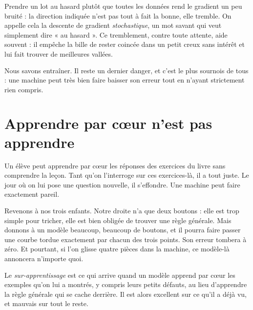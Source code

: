 \begin{plusloin}
Prendre un lot au hasard plutôt que toutes les données rend le gradient un
peu bruité : la direction indiquée n'est pas tout à fait la bonne, elle
tremble. On appelle cela la descente de gradient \emph{stochastique}, un mot
savant qui veut simplement dire « au hasard ». Ce tremblement, contre toute
attente, aide souvent : il empêche la bille de rester coincée dans un petit
creux sans intérêt et lui fait trouver de meilleures vallées.
\end{plusloin}

Nous savons entraîner. Il reste un dernier danger, et c'est le plus sournois
de tous : une machine peut très bien faire baisser son erreur tout en
n'ayant strictement rien compris.

\section{Apprendre par cœur n'est pas apprendre}

\begin{enclair}
Un élève peut apprendre par cœur les réponses des exercices du livre sans
comprendre la leçon. Tant qu'on l'interroge sur ces exercices-là, il a tout
juste. Le jour où on lui pose une question nouvelle, il s'effondre. Une
machine peut faire exactement pareil.
\end{enclair}

Revenons à nos trois enfants. Notre droite n'a que deux boutons : elle est
trop simple pour tricher, elle est bien obligée de trouver une règle
générale. Mais donnons à un modèle beaucoup, beaucoup de boutons, et il
pourra faire passer une courbe tordue exactement par chacun des trois
points. Son erreur tombera à zéro. Et pourtant, si l'on glisse quatre pièces
dans la machine, ce modèle-là annoncera n'importe quoi.

\begin{definition}
Le \emph{sur-apprentissage} est ce qui arrive quand un modèle apprend par
cœur les exemples qu'on lui a montrés, y compris leurs petits défauts, au
lieu d'apprendre la règle générale qui se cache derrière. Il est alors
excellent sur ce qu'il a déjà vu, et mauvais sur tout le reste.
\end{definition}

